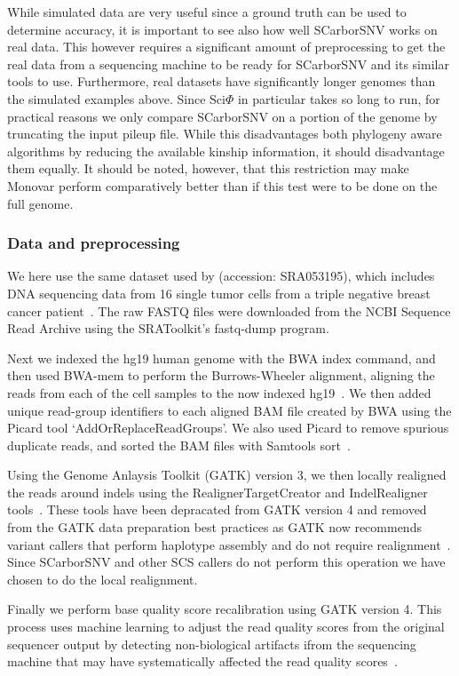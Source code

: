 \documentclass[../../main.tex]{subfiles}
\begin{document}
While simulated data are very useful since a ground truth can be used to determine accuracy, it is important to see also how well SCarborSNV works on real data.
This however requires a significant amount of preprocessing to get the real data from a sequencing machine to be ready for SCarborSNV and its similar tools to use.
Furthermore, real datasets have significantly longer genomes than the simulated examples above.
Since Sci$\Phi$ in particular takes so long to run, for practical reasons we only compare SCarborSNV on a portion of the genome by truncating the input pileup file.
While this disadvantages both phylogeny aware algorithms by reducing the available kinship information, it should disadvantage them equally.
It should be noted, however, that this restriction may make Monovar perform comparatively better than if this test were to be done on the full genome.

\subsubsection*{Data and preprocessing}
We here use the same dataset used by \cite{sciphi} (accession: SRA053195), which includes DNA sequencing data from 16 single tumor cells from a triple negative breast cancer patient~\cite{DATA}.
The raw FASTQ files were downloaded from the NCBI Sequence Read Archive using the SRAToolkit's fastq-dump program.

Next we indexed the hg19 human genome with the BWA index command, and then used BWA-mem to perform the Burrows-Wheeler alignment, aligning the reads from each of the cell samples to the now indexed hg19~\cite{BWAMEM}.
We then added unique read-group identifiers to each aligned BAM file created by BWA using the Picard tool `AddOrReplaceReadGroups'.
We also used Picard to remove spurious duplicate reads, and sorted the BAM files with Samtools sort~\cite{samtools}.

Using the Genome Anlaysis Toolkit (GATK) version 3, we then locally realigned the reads around indels using the RealignerTargetCreator and IndelRealigner tools~\cite{gatk1}.
These tools have been depracated from GATK version 4 and removed from the GATK data preparation best practices as GATK now recommends variant callers that perform haplotype assembly and do not require realignment~\cite{gatk2}.
Since SCarborSNV and other SCS callers do not perform this operation we have chosen to do the local realignment.

Finally we perform base quality score recalibration using GATK version 4.
This process uses machine learning to adjust the read quality scores from the original sequencer output by detecting non-biological artifacts ifrom the sequencing machine that may have systematically affected the read quality scores~\cite{gatk1}.
\end{document}

